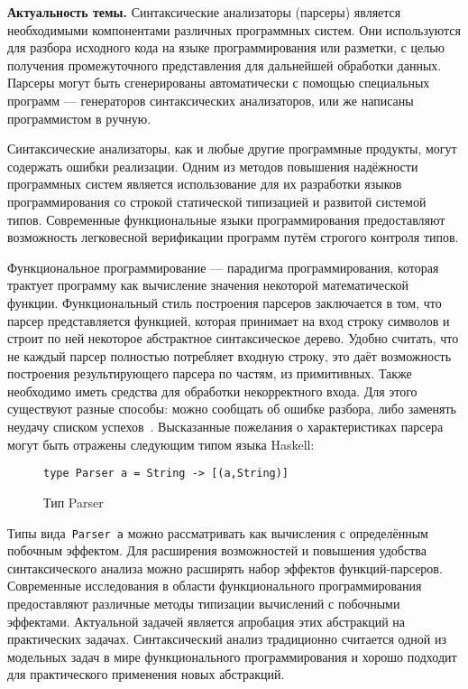 \Intro

\textbf{Актуальность темы.} Синтаксические анализаторы (парсеры) является необходимыми  
компонентами различных программных систем. Они используются для разбора исходного 
кода на языке программирования или разметки, с целью получения промежуточного 
представления для дальнейшей обработки данных. Парсеры могут быть сгенерированы 
автоматически с помощью специальных программ --- генераторов синтаксических 
анализаторов, или же написаны программистом в ручную. 

Синтаксические анализаторы, как и любые другие программные продукты, могут 
содержать ошибки реализации. Одним из методов повышения надёжности программных 
систем является использование для их разработки языков программирования со 
строкой статической типизацией и развитой системой типов. Современные функциональные 
языки программирования предоставляют возможность легковесной верификации программ
путём строгого контроля типов. 

Функциональное программирование --- парадигма программирования, которая трактует
программу как вычисление значения некоторой математической функции. 
Функциональный стиль построения парсеров заключается в том, что парсер
представляется функцией, которая принимает на вход строку символов и строит
по ней некоторое абстрактное синтаксическое дерево. Удобно считать, что не каждый
парсер полностью потребляет входную строку, это даёт возможность
построения результирующего парсера по частям, из примитивных. Также необходимо
иметь средства для обработки некорректного входа. Для этого существуют разные
способы: можно сообщать об ошибке разбора, либо заменять неудачу списком
успехов~\cite{wadlerSuccess}. Высказанные пожелания о характеристиках
парсера могут быть отражены следующим типом языка Haskell:

\begin{figure}[h]
\begin{lstlisting}
type Parser a = String -> [(a,String)]
\end{lstlisting}
\caption{Тип Parser}
\end{figure}

Типы вида~\lstinline{Parser a} можно рассматривать как вычисления с определённым 
побочным эффектом. Для расширения возможностей и повышения удобства синтаксического 
анализа можно расширять набор эффектов функций-парсеров.    
Современные исследования в области функционального программирования предоставляют
различные методы типизации вычислений с побочными эффектами. 
Актуальной задачей является апробация этих абстракций на практических
задачах. Синтаксический анализ традиционно считается одной из модельных
задач в мире функционального программирования и хорошо подходит для практического
применения новых абстракций.

